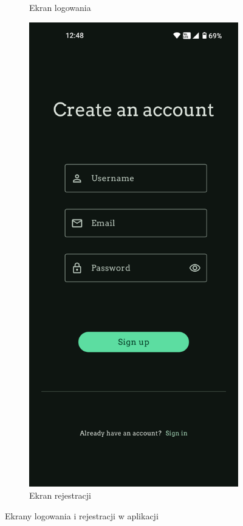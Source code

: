 \documentclass[12pt,twoside]{article}
\begin{document}
\begin{figure}[ht]
\begin{subfigure}[b]{0.48\textwidth}
        \caption{Ekran logowania}
    \end{subfigure}
    \hfill
    \begin{subfigure}[b]{0.48\textwidth}
        \includegraphics[width=\textwidth]{figures/SignUp.png}
        \caption{Ekran rejestracji}
    \end{subfigure}
    \caption{Ekrany logowania i rejestracji w aplikacji}
    \label{fig:SignInUp}
\end{figure}
\end{document}
